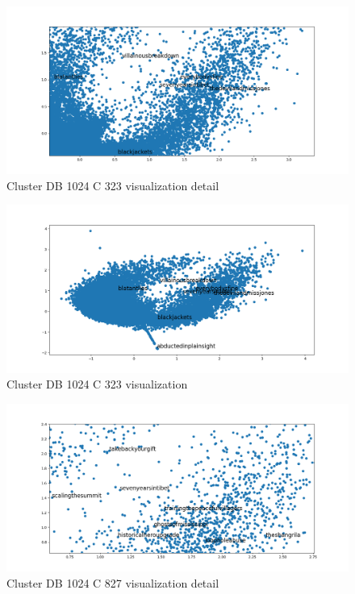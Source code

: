 \documentclass[letterpaper]{article}
\begin{document}
	\begin{figure}
	\centering
	\includegraphics[width=1\linewidth]{../images/cluster-db-1024-c323-zoom-in.png}
	\caption{Cluster DB 1024 C 323 visualization detail}
	\label{fig:cluster-visualization-zoom-in}
	\end{figure}
	
	
	\begin{figure}
	\centering
	\includegraphics[width=1\linewidth]{../images/cluster-db-1024-c323-zoom-out.png}
	\caption{Cluster DB 1024 C 323 visualization}
	\label{fig:cluster-visualization-zoom-out}
	\end{figure}
	
		\begin{figure}
	\centering
	\includegraphics[width=1\linewidth]{../images/cluster-ng-1024-c827-zoom-in.png}
	\caption{Cluster DB 1024 C 827 visualization detail}
	\label{fig:cluster-visualization-zoom-in}
	\end{figure}
	
\end{document}
